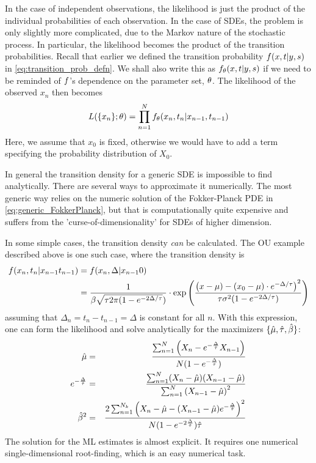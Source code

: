 In the case of independent observations, the
likelihood is just the product of the individual probabilities of each observation. In the case of SDEs, the problem is only slightly more complicated, due to the Markov nature of the stochastic process. In particular,
the likelihood becomes the product of the transition probabilities. Recall that
earlier we defined the transition probability ${f}(x,t | y,s)$ in
\cref{eq:transition_prob_defn}. We shall also write this as ${f}_{ \theta}(x,t|
y,s)$ if we need to be reminded of ${f}$'s dependence on the
parameter set, ${ \theta}$. The likelihood of the observed $x_n$ then
becomes
\begin{equation}
L(\{x_n\}; { \theta}) = \prod_{n=1}^{N} f_{ \theta}(x_n, t_n| x_{n-1}, t_{n-1})
\label{eq:SDE_discrete_likelihood}
\end{equation}
Here, we assume that $x_0$ is fixed, otherwise we would have to add a term
specifying the probability distribution of $X_0$.

In general the transition density for a generic SDE is impossible to find
analytically. There are several ways to approximate it numerically. The most
generic way relies on the numeric solution of the Fokker-Planck PDE in
\cref{eq:generic_FokkerPlanck}, but that is computationally quite expensive and suffers from the
'curse-of-dimensionality' for SDEs of higher dimension. 

In some simple cases, the transition density {\sl can} be calculated. The OU
example described above is one such case, where the transition density is
\begin{align*}
f(x_n, t_n| x_{n-1} t_{n-1}) &=
 f(x_n, \Delta| x_{n-1} 0)\\& =
 \frac{1}{ \beta \sqrt{{ \tau } 2\pi(1 -  e^{-2 \Delta/{ \tau }}})}
 	\cdot \exp\left(\frac{\left( x - \mu)  - (x_{0} - \mu) \cdot
 	 e^{-\Delta/{ \tau }} \right)^2  } {{\tau} \sigma^2  (1-e^{-2 \Delta/{ \tau }})}
 	\right) 
\end{align*}
assuming that $\Delta_n = t_n-t_{n-1} = \Delta$ is constant for all $n$.
With this expression, one can form the likelihood and solve analytically for the
maximizers $\{\hat{{\mu }} , \hat{{ \tau }}, \hat{\beta} \}$:
\begin{eqnarray} 
\hat{ \mu} &=& 
\frac{  \sum_{n=1}^{N } 
     \left( X_n - e^{-\frac{\Delta} {\hat {{ \tau }}}} X_{n-1} \right)} 
	 { N( 1-e^{-\frac {\Delta} {\hat {{ \tau }}}}) }
\\
e^{-\frac {\Delta}{\hat{{ \tau }}} } &=& 
\frac { \sum_{n=1}^{N} 
			( X_n -  \hat \mu)(X_{n-1} -  \hat \mu) }
    {   \sum_{n=1}^{N } \left( X_{n-1} - \hat \mu
    \right)^2 }
\\
\hat\beta^2 &=&  
\frac{ 2  \sum_{n=1}^{N_k}  \left( X_n - \hat \mu - (X_{n-1} -
\hat \mu) e^{-\frac {\Delta} {\hat {{ \tau }}}} \right)^2 } 
	  { N (1-e^{-2\frac {\Delta} {\hat {{ \tau }}}}) \hat {{ \tau }}}
\end{eqnarray}
The solution for the ML estimates is almost explicit. It requires one numerical
single-dimensional root-finding, which is an easy numerical task.

